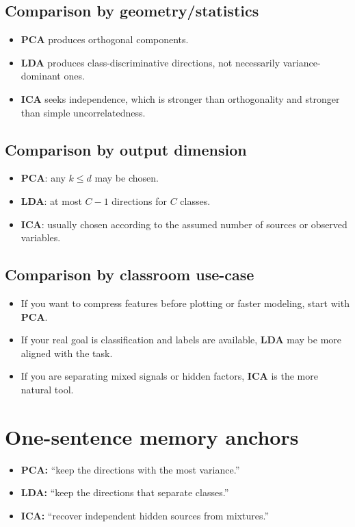 \documentclass[11pt]{article}
\begin{document}
\subsection{Comparison by geometry/statistics}
\begin{itemize}[leftmargin=*]
  \item \textbf{PCA} produces orthogonal components.
  \item \textbf{LDA} produces class-discriminative directions, not necessarily variance-dominant ones.
  \item \textbf{ICA} seeks independence, which is stronger than orthogonality and stronger than simple uncorrelatedness.
\end{itemize}

\subsection{Comparison by output dimension}
\begin{itemize}[leftmargin=*]
  \item \textbf{PCA}: any $k \le d$ may be chosen.
  \item \textbf{LDA}: at most $C-1$ directions for $C$ classes.
  \item \textbf{ICA}: usually chosen according to the assumed number of sources or observed variables.
\end{itemize}

\subsection{Comparison by classroom use-case}
\begin{itemize}[leftmargin=*]
  \item If you want to compress features before plotting or faster modeling, start with \textbf{PCA}.
  \item If your real goal is classification and labels are available, \textbf{LDA} may be more aligned with the task.
  \item If you are separating mixed signals or hidden factors, \textbf{ICA} is the more natural tool.
\end{itemize}

\section{One-sentence memory anchors}
\begin{itemize}[leftmargin=*]
  \item \textbf{PCA:} ``keep the directions with the most variance.''
  \item \textbf{LDA:} ``keep the directions that separate classes.''
  \item \textbf{ICA:} ``recover independent hidden sources from mixtures.''
\end{itemize}
\end{document}
